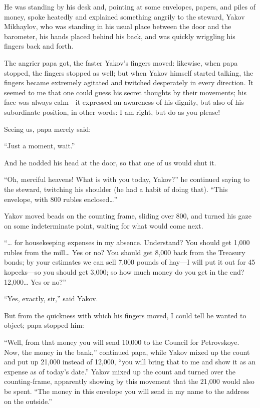 He was standing by his desk and, pointing at some envelopes, papers, and piles of money, spoke heatedly and explained something angrily to the steward, Yakov Mikhaylov, who was standing in his usual place between the door and the barometer, his hands placed behind his back, and was quickly wriggling his fingers back and forth.

The angrier papa got, the faster Yakov's fingers moved: likewise, when papa stopped, the fingers stopped as well; but when Yakov himself started talking, the fingers became extremely agitated and twitched desperately in every direction. It seemed to me that one could guess his secret thoughts by their movements; his face was always calm---it expressed an awareness of his dignity, but also of his subordinate position, in other words: I am right, but do as you please!

Seeing us, papa merely said:

``Just a moment, wait.'' %

And he nodded his head at the door, so that one of us would shut it.

``Oh, merciful heavens! What is with you today, Yakov?'' he continued saying to the steward, twitching his shoulder (he had a habit of doing that). ``This envelope, with 800 rubles enclosed\ldots{}'' %

Yakov moved beads on the counting frame, sliding over 800, and turned his gaze on some indeterminate point, waiting for what would come next.

``\ldots{} for housekeeping expenses in my absence. Understand? You should get 1,000 rubles from the mill\ldots{} Yes or no? You should get 8,000 back from the Treasury bonds; by your estimates we can sell 7,000 pounds of hay---I will put it out for 45 kopecks---so you should get 3,000; so how much money do you get in the end? 12,000\ldots{} Yes or no?'' %

``Yes, exactly, sir,'' said Yakov. %

But from the quickness with which his fingers moved, I could tell he wanted to object; papa stopped him:

``Well, from that money you will send 10,000 to the Council for Petrovskoye. Now, the money in the bank,'' continued papa, while Yakov mixed up the count and put up 21,000 instead of 12,000, ``you will bring that to me and show it as an expense as of today's date.'' Yakov mixed up the count and turned over the counting-frame, apparently showing by this movement that the 21,000 would also be spent. ``The money in this envelope you will send in my name to the address on the outside.'' %


